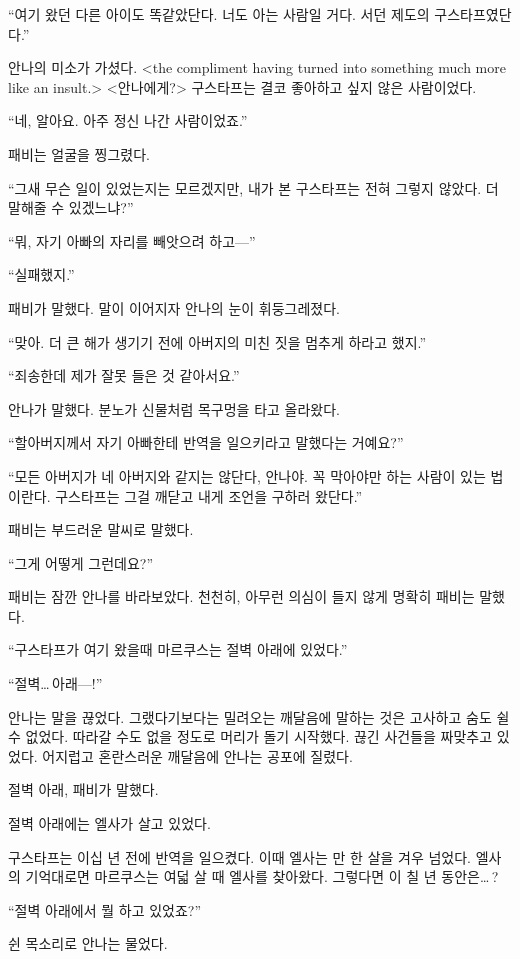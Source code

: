 ``여기 왔던 다른 아이도 똑같았단다. 너도 아는 사람일 거다. 서던 제도의 구스타프였단다.''

안나의 미소가 가셨다. <the compliment having turned into something much more like an insult.> <안나에게\append?> 구스타프는 결코 좋아하고 싶지 않은 사람이었다.

``네, 알아요. 아주 정신 나간 사람이었죠.''

패비는 얼굴을 찡그렸다.

``그새 무슨 일이 있었는지는 모르겠지만, 내가 본 구스타프는 전혀 그렇지 않았다. 더 말해줄 수 있겠느냐?''

``뭐, 자기 아빠의 자리를 빼앗으려 하고—''

``실패했지.''

패비가 말했다. 말이 이어지자 안나의 눈이 휘둥그레졌다.

``맞아. 더 큰 해가 생기기 전에 아버지의 미친 짓을 멈추게 하라고 했지.''

``죄송한데 제가 잘못 들은 것 같아서요.''

안나가 말했다. 분노가 신물처럼 목구멍을 타고 올라왔다.

``할아버지께서 자기 아빠한테 반역을 일으키라고 말했다는 거예요?''

``모든 아버지가 네 아버지와 같지는 않단다, 안나야. 꼭 막아야만 하는 사람이 있는 법이란다. 구스타프는 그걸 깨닫고 내게 조언을 구하러 왔단다.''

패비는 부드러운 말씨로 말했다.

``그게 어떻게 그런데요?''

패비는 잠깐 안나를 바라보았다. 천천히, 아무런 의심이 들지 않게 명확히 패비는 말했다.

``구스타프가 여기 왔을때 마르쿠스는 절벽 아래에 있었다.''

``절벽\ldots\,아래—!''

안나는 말을 끊었다. 그랬다기보다는 밀려오는 깨달음에 말하는 것은 고사하고 숨도 쉴 수 없었다. 따라갈 수도 없을 정도로 머리가 돌기 시작했다. 끊긴 사건들을 짜맞추고 있었다. 어지럽고 혼란스러운 깨달음에 안나는 공포에 질렸다.

절벽 아래, 패비가 말했다.

절벽 아래에는 엘사가 살고 있었다.

구스타프는 이십 년 전에 반역을 일으켰다. 이때 엘사는 만 한 살을 겨우 넘었다. 엘사의 기억대로면 마르쿠스는 여덟 살 때 엘사를 찾아왔다. 그렇다면 이 칠 년 동안은\ldots\,?

``절벽 아래에서 뭘 하고 있었죠?''

쉰 목소리로 안나는 물었다.

